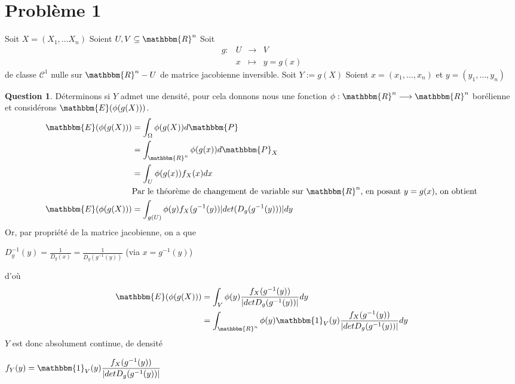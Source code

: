 \documentclass[12pt]{article}
\newcommand{\R}{\mathbbm{R}}
\newcommand{\1}{\mathbbm{1}}
\newcommand{\E}{\mathbbm{E}}
\newcommand{\Prob}{\mathbbm{P}}
\newcommand{\fonction}[5]{
\begin{displaymath}
\begin{array}{l|rcl}
\displaystyle
#1 : & #2 & \longrightarrow & #3 \\
    & #4 & \longmapsto & #5
\end{array}
\end{displaymath}
}
\theoremstyle{definition}\newtheorem{defn}{Définition}
\theoremstyle{definition}\newtheorem{exm}{Exemple}
\theoremstyle{definition}\newtheorem{rem}{Remarque}
\theoremstyle{definition}\newtheorem{algo}{Algorithme}
\theoremstyle{remark}\newtheorem{exo}{Exercice}
\theoremstyle{remark}\newtheorem{nota}{Notation}
\theoremstyle{definition}\newtheorem{1q}{Question}
\theoremstyle{definition}\newtheorem{2q}{Question}
\theoremstyle{definition}\newtheorem{3q}{Question}
\theoremstyle{definition}\newtheorem{4q}{Question}
\theoremstyle{definition}\newtheorem{2qs1}{}
\theoremstyle{definition}\newtheorem{2qs2}{}
\theoremstyle{definition}\newtheorem{2qs3}{}
\theoremstyle{definition}\newtheorem{2qs4}{}
\theoremstyle{definition}\newtheorem{4qs2}{}
\theoremstyle{definition}\newtheorem{4qs3}{}
\begin{document}
\section{Problème 1}
Soit $X=(X_1, \ldots X_n)$\newline
Soient  $U,V\subseteq \R^n$ \newline
Soit \fonction{g}{U}{V}{x}{y=g(x)} de classe $\mathcal{C}^1$ nulle sur $\R^n-U$ de matrice jacobienne inversible.\newline
Soit $Y:= g(X)$\newline
Soient $x=(x_1,\ldots, x_n)$ et $y=(y_1,\ldots, y_n)$
\begin{1q}
Déterminons si $Y$ admet une densité, pour cela donnons nous une fonction $\phi : \R^n \longrightarrow \R^n$ borélienne et considérons $\E(\phi(g(X)))$.
\begin{align*}
\E(\phi(g(X))) &= \int_{\Omega}\phi(g(X))d\Prob\\
&= \int_{\R^n}\phi(g(x))d\Prob_X\\
&= \int_{U}\phi(g(x))f_X(x)dx\\
& \text{Par le théorème de changement de variable sur $\R^n$, en posant $y=g(x)$, on obtient}\\
\E(\phi(g(X)))&= \int_{g(U)}\phi(y)f_X(g^{-1}(y))|det(D_g(g^{-1}(y)))|dy\\
\end{align*}
Or, par propriété de la matrice jacobienne, on a que
\begin{center}$ \displaystyle D_g^{-1}(y) = \frac{1}{D_g(x)} = \frac{1}{D_g(g^{-1}(y))} $     (via $x=g^{-1}(y)$)\end{center}
d'où
\begin{align*}
\E(\phi(g(X))) &=\int_{V}\phi(y)\frac{f_X(g^{-1}(y))}{|detD_g(g^{-1}(y))|}dy\\
&= \int_{\R^n}\phi(y)\1_V(y)\frac{f_X(g^{-1}(y))}{ |detD_g(g^{-1}(y))|}dy\\
\end{align*}
$Y$ est donc absolument continue, de densité
\begin{center}$\displaystyle f_Y(y) = \1_V(y)\frac{f_X(g^{-1}(y))}{|detD_g(g^{-1}(y))|}$\end{center}
\end{1q}
\end{document}
